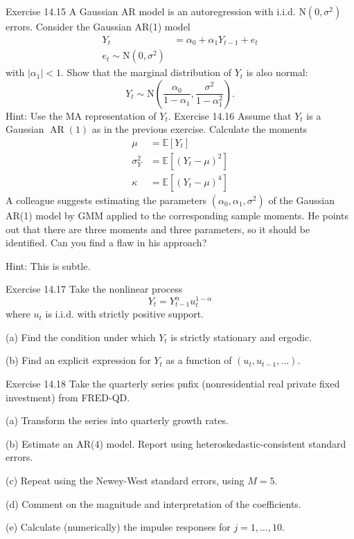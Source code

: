 \documentclass[10pt]{article}
\begin{document}
Exercise 14.15 A Gaussian AR model is an autoregression with i.i.d. $\mathrm{N}\left(0, \sigma^{2}\right)$ errors. Consider the Gaussian AR(1) model
$$
\begin{aligned}
Y_{t} &=\alpha_{0}+\alpha_{1} Y_{t-1}+e_{t} \\
e_{t} \sim \mathrm{N}\left(0, \sigma^{2}\right)
\end{aligned}
$$
with $\left|\alpha_{1}\right|<1$. Show that the marginal distribution of $Y_{t}$ is also normal:
$$
Y_{t} \sim \mathrm{N}\left(\frac{\alpha_{0}}{1-\alpha_{1}}, \frac{\sigma^{2}}{1-\alpha_{1}^{2}}\right) .
$$
Hint: Use the MA representation of $Y_{t}$. Exercise 14.16 Assume that $Y_{t}$ is a Gaussian $\operatorname{AR}(1)$ as in the previous exercise. Calculate the moments
$$
\begin{aligned}
\mu &=\mathbb{E}\left[Y_{t}\right] \\
\sigma_{Y}^{2} &=\mathbb{E}\left[\left(Y_{t}-\mu\right)^{2}\right] \\
\kappa &=\mathbb{E}\left[\left(Y_{t}-\mu\right)^{4}\right]
\end{aligned}
$$
A colleague suggests estimating the parameters $\left(\alpha_{0}, \alpha_{1}, \sigma^{2}\right)$ of the Gaussian AR(1) model by GMM applied to the corresponding sample moments. He points out that there are three moments and three parameters, so it should be identified. Can you find a flaw in his approach?

Hint: This is subtle.

Exercise 14.17 Take the nonlinear process
$$
Y_{t}=Y_{t-1}^{\alpha} u_{t}^{1-\alpha}
$$
where $u_{t}$ is i.i.d. with strictly positive support.

(a) Find the condition under which $Y_{t}$ is strictly stationary and ergodic.

(b) Find an explicit expression for $Y_{t}$ as a function of $\left(u_{t}, u_{t-1}, \ldots\right)$.

Exercise 14.18 Take the quarterly series pnfix (nonresidential real private fixed investment) from FRED-QD.

(a) Transform the series into quarterly growth rates.

(b) Estimate an AR(4) model. Report using heteroskedastic-consistent standard errors.

(c) Repeat using the Newey-West standard errors, using $M=5$.

(d) Comment on the magnitude and interpretation of the coefficients.

(e) Calculate (numerically) the impulse responses for $j=1, \ldots, 10$.
\end{document}
